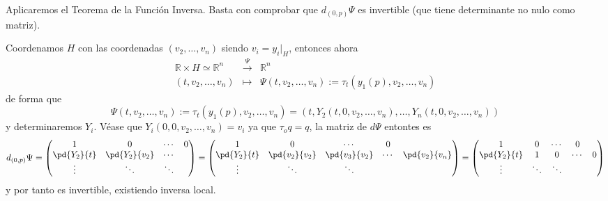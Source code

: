     \begin{dem}
        Aplicaremos el Teorema de la Función Inversa. Basta con comprobar que $d_{(0,p)} \Psi $ es invertible (que tiene determinante no nulo como matriz).

        Coordenamos $H$ con las coordenadas $(v_2, \ldots, v_n)$ siendo $v_i=y_i \Big|_H$, entonces ahora
        $$\begin{array}{rcl}
            \mathbb R \times H \simeq \mathbb R^n & \overset{\Psi}{\longrightarrow} & \mathbb R^n  \\
             (t,v_2, \ldots, v_n) & \longmapsto & \Psi(t,v_2, \ldots, v_n):=\tau_t (y_1(p),v_2, \ldots, v_n)
        \end{array}$$
        de forma que 
        $$ \Psi(t,v_2, \ldots, v_n):=\tau_t (y_1(p),v_2, \ldots, v_n) = (t,Y_2(t,0,v_2, \ldots, v_n), \ldots, Y_n(t,0,v_2, \ldots, v_n))$$
        y determinaremos $Y_i$. Véase que $Y_i(0,0,v_2, \ldots, v_n)=v_i$ ya que $\tau_o q =q$, la matriz de $d\Psi$ entontes es
        $$d_{(0,p)}\Psi=\begin{pmatrix}
            1 & 0 & \cdots & 0 \\
            \pd{Y_2}{t} & \pd{Y_2}{v_2} & \cdots & \\
            \vdots & \ddots & \ddots 
        \end{pmatrix}=\begin{pmatrix}
            1 & 0 & \cdots & 0 \\
            \pd{Y_2}{t} & \pd{v_2}{v_2} & \pd{v_3}{v_2} &\cdots &\pd{v_2}{v_n} \\
            \vdots & \ddots & \ddots 
        \end{pmatrix}=\begin{pmatrix}
            1 & 0 & \cdots & 0 \\
            \pd{Y_2}{t} & 1 & 0 &\cdots & 0 \\
            \vdots & \ddots & \ddots 
        \end{pmatrix}$$
        y por tanto es invertible, existiendo inversa local.
         \end{dem}

